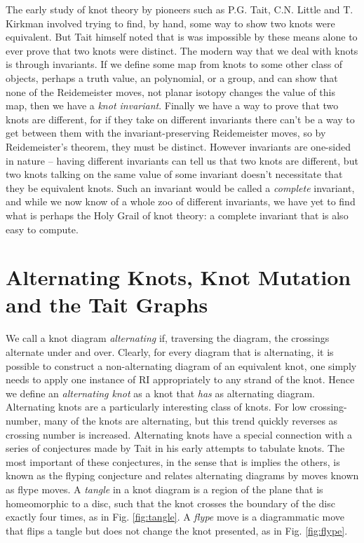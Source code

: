 \documentclass[12pt]{report}
\begin{document}
The early study of knot theory by pioneers such as P.G. Tait, C.N. Little and T. Kirkman involved trying to find, by hand, some way to show two knots were equivalent. But Tait himself noted that is was impossible by these means alone to ever prove that two knots were distinct. The modern way that we deal with knots is through invariants. If we define some map from knots to some other class of objects, perhaps a truth value, an polynomial, or a group, and can show that none of the Reidemeister moves, not planar isotopy changes the value of this map, then we have a \textit{knot invariant}. Finally we have a way to prove that two knots are different, for if they take on different invariants there can't be a way to get between them with the invariant-preserving Reidemeister moves, so by Reidemeister's theorem, they must be distinct. However invariants are one-sided in nature -- having different invariants can tell us that two knots are different, but two knots talking on the same value of some invariant doesn't necessitate that they be equivalent knots. Such an invariant would be called a \textit{complete} invariant, and while we now know of a whole zoo of different invariants, we have yet to find what is perhaps the Holy Grail of knot theory: a complete invariant that is also easy to compute.

\section{Alternating Knots, Knot Mutation and the Tait Graphs}
We call a knot diagram \textit{alternating} if, traversing the diagram, the crossings alternate under and over. Clearly, for every diagram that is alternating, it is possible to construct a non-alternating diagram of an equivalent knot, one simply needs to apply one instance of RI appropriately to any strand of the knot. Hence we define an \textit{alternating knot} as a knot that \textit{has} as alternating diagram. Alternating knots are a particularly interesting class of knots. For low crossing-number, many of the knots are alternating, but this trend quickly reverses as crossing number is increased. Alternating knots have a special connection with a series of conjectures made by Tait in his early attempts to tabulate knots. The most important of these conjectures, in the sense that is implies the others, is known as the flyping conjecture and relates alternating diagrams by moves known as flype moves. A \textit{tangle} in a knot diagram is a region of the plane that is homeomorphic to a disc, such that the knot crosses the boundary of the disc exactly four times, as in Fig. \ref{fig:tangle}. A \textit{flype} move is a diagrammatic move that flips a tangle but does not change the knot presented, as in Fig. \ref{fig:flype}.
\end{document}
